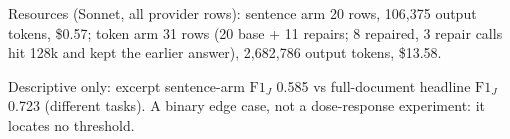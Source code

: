 Resources (Sonnet, all provider rows): sentence arm 20 rows, 106,375 output tokens, \$0.57; token arm 31 rows (20 base + 11 repairs; 8 repaired, 3 repair calls hit 128k and kept the earlier answer), 2,682,786 output tokens, \$13.58.\par
Descriptive only: excerpt sentence-arm $\mathrm{F1}_{J}$ 0.585 vs full-document headline $\mathrm{F1}_{J}$ 0.723 (different tasks). A binary edge case, not a dose-response experiment: it locates no threshold.\par
\endgroup
\par\addvspace{\intextsep}
